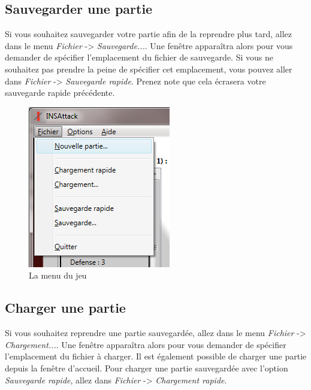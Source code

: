 \subsection {Sauvegarder une partie}
Si vous souhaitez sauvegarder votre partie afin de la reprendre plus tard, allez dans le menu \emph{Fichier} -> \emph{Sauvegarde...}.
Une fenêtre apparaîtra alors pour vous demander de spécifier l'emplacement du fichier de sauvegarde.
Si vous ne souhaitez pas prendre la peine de spécifier cet emplacement, vous pouvez aller dans \emph{Fichier} -> \emph{Sauvegarde rapide}.
Prenez note que cela écrasera votre sauvegarde rapide précédente.

\begin{figure}[!h]
\centering
\includegraphics{Parties/Images/Menu.png}
\caption{La menu du jeu}
\label{fig:menu}
\end{figure}

\subsection {Charger une partie}
Si vous souhaitez reprendre une partie sauvegardée, allez dans le menu \emph{Fichier} -> \emph{Chargement...}.
Une fenêtre apparaîtra alors pour vous demander de spécifier l'emplacement du fichier à charger.
Il est également possible de charger une partie depuis la fenêtre d'accueil.
Pour charger une partie sauvegardée avec l'option \emph{Sauvegarde rapide}, allez dans \emph{Fichier} -> \emph{Chargement rapide}.

